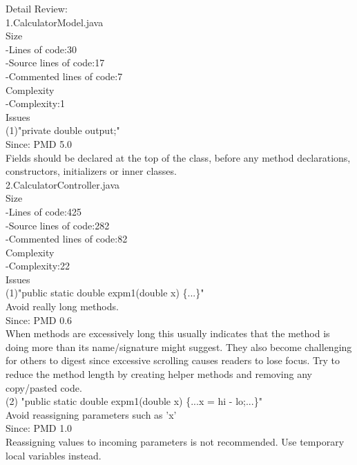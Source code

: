 \documentclass{article}
\begin{document}
Detail Review:\\
1.CalculatorModel.java\\

Size\\
-Lines of code:30\\
-Source lines of code:17\\
-Commented lines of code:7\\

Complexity\\
-Complexity:1 \\

Issues\\
(1)"private double output;"\\
Since: PMD 5.0\\
Fields should be declared at the top of the class, before any method declarations, constructors, initializers or inner classes.\\

2.CalculatorController.java\\

Size\\
-Lines of code:425\\
-Source lines of code:282\\
-Commented lines of code:82\\

Complexity\\
-Complexity:22 \\

Issues\\

(1)"public static double expm1(double x) \{...\}"\\
Avoid really long methods.\\
Since: PMD 0.6\\
When methods are excessively long this usually indicates that the method is doing more than its name/signature might suggest. They also become challenging for others to digest since excessive scrolling causes readers to lose focus. Try to reduce the method length by creating helper methods and removing any copy/pasted code.\\

(2) "public static double expm1(double x) \{...x = hi - lo;...\}"\\
Avoid reassigning parameters such as 'x'\\
Since: PMD 1.0\\
Reassigning values to incoming parameters is not recommended. Use temporary local variables instead.\\
\end{document}

